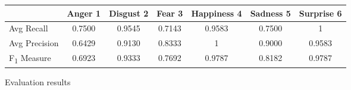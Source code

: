 \begin{figure}[h]
\begin{center}
\begin{tabular}{ | l || c | c | c | c | c | c | }
    \hline
          & Anger 1 & Disgust 2 & Fear 3 & Happiness 4 & Sadness 5 & Surprise 6 \\ \hline \hline
        Avg Recall & 0.7500 & 0.9545 & 0.7143 & 0.9583 & 0.7500 & 1 \\ \hline
        Avg Precision & 0.6429 & 0.9130 & 0.8333 & 1 & 0.9000 & 0.9583 \\ \hline
        F\textsubscript{1} Measure & 0.6923 & 0.9333 & 0.7692 & 0.9787 & 0.8182 &
        0.9787 \\ \hline
    \end{tabular}
    \caption{Evaluation results}
    \label{fig:averageRecall}
\end{center}
\end{figure}
